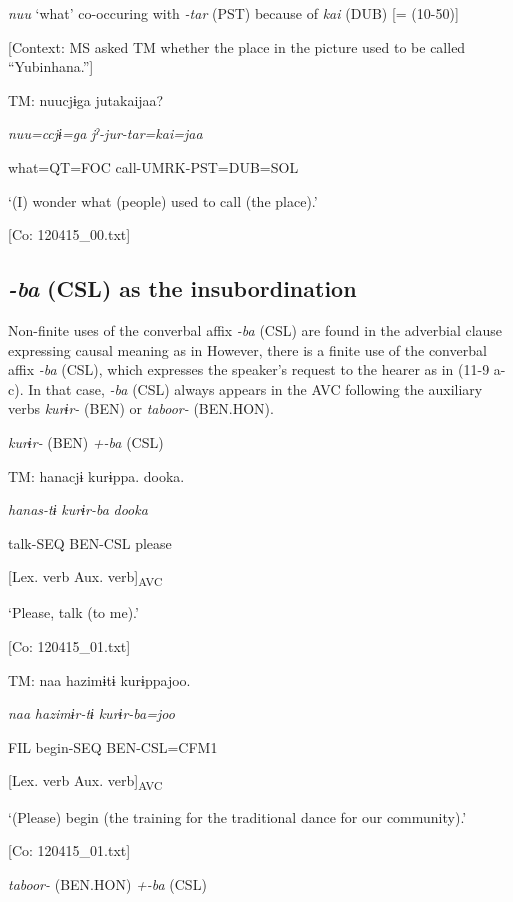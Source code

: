 \ea\label{ex:11-8}  \textit{nuu} ‘what’ co-occuring with \textit{{}-tar} (PST) because of \textit{kai} (DUB) [= (10-50)]

  [Context: MS asked TM whether the place in the picture used to be called “Yubinhana.”]

  TM:  nuucjɨga  jutakaijaa?

    \textit{nuu=ccjɨ=ga}  \textit{jˀ-jur-tar=kai=jaa}

    what=QT=FOC  call-UMRK-PST=DUB=SOL

    ‘(I) wonder what (people) used to call (the place).’

    [Co: 120415\_00.txt]
\z

\subsection{\textit{{}-ba} (CSL) as the insubordination}\label{sec:11.2.2}

Non-finite uses of the converbal affix \textit{-ba} (CSL) are found in the adverbial clause expressing causal meaning as in  However, there is a finite use of the converbal affix \textit{-ba} (CSL), which expresses the speaker’s request to the hearer as in (11-9 a-c). In that case, \textit{{}-ba} (CSL) always appears in the AVC following the auxiliary verbs \textit{kurɨr-} (BEN) or \textit{taboor-} (BEN.HON).

\ea\label{ex:11-9}  \textit{kurɨr-} (BEN) \textit{+-ba} (CSL)

  \ea  TM:  hanacjɨ  kurɨppa.  dooka.

      \textit{hanas-tɨ}  \textit{kurɨr-ba}  \textit{dooka}

      talk-SEQ  BEN-CSL  please

      [Lex. verb  Aux. verb]\textsubscript{AVC}  

      ‘Please, talk (to me).’

      [Co: 120415\_01.txt]

  \ex  TM:  naa  hazimɨtɨ  kurɨppajoo.

      \textit{naa}  \textit{hazimɨr-tɨ}  \textit{kurɨr-ba=joo}

      FIL  begin-SEQ  BEN-CSL=CFM1

        [Lex. verb  Aux. verb]\textsubscript{AVC}

      ‘(Please) begin (the training for the traditional dance for our community).’

      [Co: 120415\_01.txt]

  \textit{taboor-} (BEN.HON) \textit{+-ba} (CSL)

